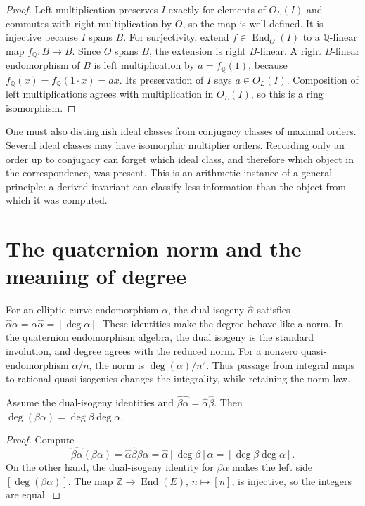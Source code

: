 \begin{proof}
Left multiplication preserves $I$ exactly for elements of
$O_L(I)$ and commutes with right multiplication by $O$, so
the map is well-defined. It is injective because $I$ spans $B$.
For surjectivity, extend $f\in\operatorname{End}_O(I)$ to a
$\mathbb Q$-linear map $f_{\mathbb Q}:B\to B$. Since $O$
spans $B$, the extension is right $B$-linear. A right
$B$-linear endomorphism of $B$ is left multiplication by
$a=f_{\mathbb Q}(1)$, because
$f_{\mathbb Q}(x)=f_{\mathbb Q}(1\cdot x)=ax$.
Its preservation of $I$ says $a\in O_L(I)$. Composition of
left multiplications agrees with multiplication in $O_L(I)$,
so this is a ring isomorphism.
\end{proof}

One must also distinguish ideal classes from conjugacy classes
of maximal orders. Several ideal classes may have isomorphic
multiplier orders. Recording only an order up to conjugacy can
forget which ideal class, and therefore which object in the
correspondence, was present. This is an arithmetic instance of
a general principle: a derived invariant can classify less
information than the object from which it was computed.

\section{The quaternion norm and the meaning of degree}

For an elliptic-curve endomorphism $\alpha$, the dual isogeny
$\widehat\alpha$ satisfies
$\widehat\alpha\alpha=\alpha\widehat\alpha=[\deg\alpha]$.
These identities make the degree behave like a norm. In the
quaternion endomorphism algebra, the dual isogeny is the standard
involution, and degree agrees with the reduced norm. For a
nonzero quasi-endomorphism $\alpha/n$, the norm is
$\deg(\alpha)/n^2$. Thus passage from integral maps to rational
quasi-isogenies changes the integrality, while retaining the
norm law.

\begin{proposition}
Assume the dual-isogeny identities and
$\widehat{\beta\alpha}=\widehat\alpha\widehat\beta$.
Then $\deg(\beta\alpha)=\deg\beta\deg\alpha$.
\end{proposition}

\begin{proof}
Compute
\[
 \widehat{\beta\alpha}(\beta\alpha)
 =\widehat\alpha\widehat\beta\beta\alpha
 =\widehat\alpha[\deg\beta]\alpha
 =[\deg\beta\deg\alpha].
\]
On the other hand, the dual-isogeny identity for $\beta\alpha$
makes the left side $[\deg(\beta\alpha)]$. The map
$\mathbb Z\to\operatorname{End}(E)$, $n\mapsto[n]$, is
injective, so the integers are equal.
\end{proof}

